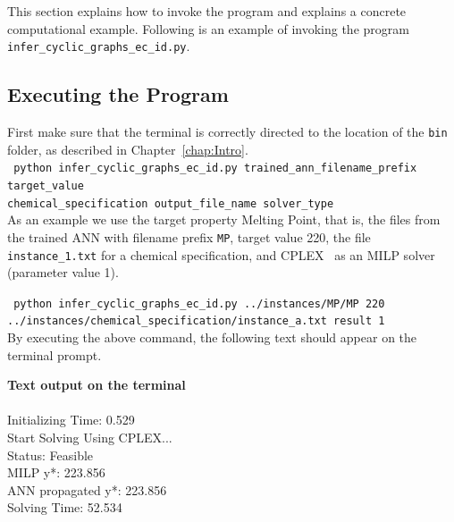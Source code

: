 \documentclass[11pt,titlepage,dvipdfmx,twoside]{book}
\begin{document}
This section explains how to invoke the program
and explains a concrete computational example.
Following is an example of invoking the
program {\tt infer\_cyclic\_graphs\_ec\_id.py}.

 


\subsection{Executing the Program}
\label{chap:Exp_1}

First make sure that the terminal is 
correctly directed to the location
of the {\tt bin} folder, as described in Chapter~\ref{chap:Intro}. \\

\noindent
{\tt 
 python  infer\_cyclic\_graphs\_ec\_id.py 
trained\_ann\_filename\_prefix
target\_value \\
 \phantom{python } 
 chemical\_specification
output\_file\_name
solver\_type
 }\\


As an example we use the target property Melting Point, 
that is, the files from the trained ANN with filename prefix {\tt MP},
target value 220,
the file {\tt instance\_1.txt} for a chemical specification,
and CPLEX~\cite{cplex} as an MILP solver (parameter value 1).

{\tt 
 python infer\_cyclic\_graphs\_ec\_id.py 
 ../instances/MP/MP
220 \\
 \phantom{python } 
 ../instances/chemical\_specification/instance\_a.txt
result
1
 }\\


By executing the above command, the following text should appear on the terminal prompt.

\bigskip

\begin{oframed}
{\bf Text output on the terminal}\\\\
 Initializing Time: 0.529  \\
Start Solving Using CPLEX...\\
Status: Feasible 		\\
MILP y*: 223.856 		\\
ANN propagated y*: 223.856 \\
Solving Time: 52.534       
\end{oframed}
\end{document}
